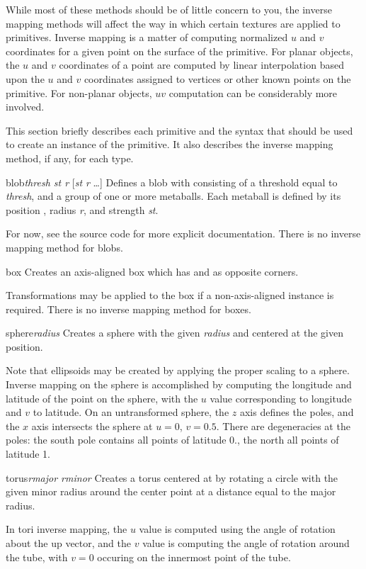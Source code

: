 While most of these methods should be of little concern to you, the
inverse mapping methods
will affect the way in which certain textures are applied to primitives.
Inverse mapping is a matter of computing normalized $u$ and $v$ coordinates
for a given point on the surface of the primitive.  For planar objects,
the $u$ and $v$ coordinates of a point are computed
by linear interpolation based upon the $u$ and $v$ coordinates assigned
to vertices or other known points on the primitive.  For non-planar
objects, $uv$ computation can be considerably more involved.

This section briefly describes each primitive and
the syntax that should be used to create an instance of the primitive.
It also describes the inverse mapping method, if any, for each type.

\begin{defprim}{blob}{{\em thresh st r}  [{\em st r}  \ldots]}
	Defines a blob with consisting of a threshold equal to {\em thresh},
	and a
	group of one or more metaballs.  Each metaball is defined by 
	its position , radius {\em r}, and strength {\em st}.
\end{defprim}
For now, see the source code for more explicit documentation.
There is no inverse mapping method for blobs.

\begin{defprim}{box}{ }
	Creates an axis-aligned box
	which has  and  as
	opposite corners.
\end{defprim}
Transformations may be applied to the box if a non-axis-aligned instance
is required.  There is no inverse mapping method for boxes.

\begin{defprim}{sphere}{{\em radius} }
	Creates a sphere with the given {\em radius} and centered at the
	given position.
\end{defprim}
Note that ellipsoids may be created by applying the proper scaling
to a sphere.  Inverse mapping on the sphere is accomplished
by computing the longitude and latitude of the point on the sphere,
with the $u$ value corresponding to longitude and $v$ to latitude.
On an untransformed sphere, the $z$ axis defines the poles, and the
$x$ axis intersects the sphere at $u = 0$, $v = 0.5$.  There are
degeneracies at the poles: the south pole contains all points of
latitude 0., the north all points of latitude 1.

\begin{defprim}{torus}{{\em rmajor rminor}  }
	Creates a torus centered at  by rotating
	a circle with the given minor radius around the center
	point at a distance equal to the major radius. 
\end{defprim}
In tori inverse mapping,
the $u$ value is computed using the angle of rotation about the
up vector, and the $v$ value is computing the angle of rotation
around the tube, with $v=0$ occuring on the innermost point of the tube.

